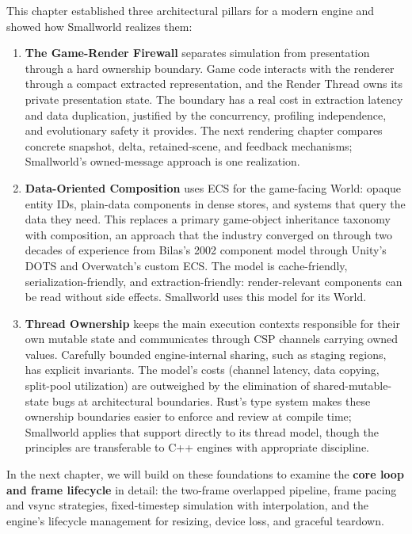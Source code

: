 \documentclass[
  11pt,
  letterpaper,
  DIV=11,
  numbers=noendperiod,
  twoside,
  open=right]{scrreprt}
\begin{document}
This chapter established three architectural pillars for a modern engine
and showed how Smallworld realizes them:

\begin{enumerate}
\def\labelenumi{\arabic{enumi}.}
\item
  \textbf{The Game-Render Firewall} separates simulation from
  presentation through a hard ownership boundary. Game code interacts
  with the renderer through a compact extracted representation, and the
  Render Thread owns its private presentation state. The boundary has a
  real cost in extraction latency and data duplication, justified by the
  concurrency, profiling independence, and evolutionary safety it
  provides. The next rendering chapter compares concrete snapshot,
  delta, retained-scene, and feedback mechanisms; Smallworld's
  owned-message approach is one realization.
\item
  \textbf{Data-Oriented Composition} uses ECS for the game-facing World:
  opaque entity IDs, plain-data components in dense stores, and systems
  that query the data they need. This replaces a primary game-object
  inheritance taxonomy with composition, an approach that the industry
  converged on through two decades of experience from Bilas's 2002
  component model through Unity's DOTS and Overwatch's custom ECS. The
  model is cache-friendly, serialization-friendly, and
  extraction-friendly: render-relevant components can be read without
  side effects. Smallworld uses this model for its World.
\item
  \textbf{Thread Ownership} keeps the main execution contexts
  responsible for their own mutable state and communicates through CSP
  channels carrying owned values. Carefully bounded engine-internal
  sharing, such as staging regions, has explicit invariants. The model's
  costs (channel latency, data copying, split-pool utilization) are
  outweighed by the elimination of shared-mutable-state bugs at
  architectural boundaries. Rust's type system makes these ownership
  boundaries easier to enforce and review at compile time; Smallworld
  applies that support directly to its thread model, though the
  principles are transferable to C++ engines with appropriate
  discipline.
\end{enumerate}

In the next chapter, we will build on these foundations to examine the
\textbf{core loop and frame lifecycle} in detail: the two-frame
overlapped pipeline, frame pacing and vsync strategies, fixed-timestep
simulation with interpolation, and the engine's lifecycle management for
resizing, device loss, and graceful teardown.
\end{document}
